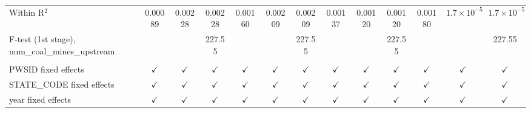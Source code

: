 \begin{table}[htbp]
\begin{adjustbox}{width = \textwidth, center}
\begin{tabular}{lcccccccccccc}
         Within R$^2$                                      & 0.00089       & 0.00228        & 0.00228       & 0.00160       & 0.00209        & 0.00209       & 0.00137       & 0.00120       & 0.00120       & 0.00180       & $1.7\times 10^{-5}$  & $1.7\times 10^{-5}$\\   
         F-test (1st stage), num\_coal\_mines\_upstream    &               &                & 227.55        &               &                & 227.55        &               &               & 227.55        &               &                      & 227.55\\  
          \\
         PWSID fixed effects                               & $\checkmark$  & $\checkmark$   & $\checkmark$  & $\checkmark$  & $\checkmark$   & $\checkmark$  & $\checkmark$  & $\checkmark$  & $\checkmark$  & $\checkmark$  & $\checkmark$         & $\checkmark$\\   
         STATE\_CODE fixed effects                         & $\checkmark$  & $\checkmark$   & $\checkmark$  & $\checkmark$  & $\checkmark$   & $\checkmark$  & $\checkmark$  & $\checkmark$  & $\checkmark$  & $\checkmark$  & $\checkmark$         & $\checkmark$\\   
         year fixed effects                                & $\checkmark$  & $\checkmark$   & $\checkmark$  & $\checkmark$  & $\checkmark$   & $\checkmark$  & $\checkmark$  & $\checkmark$  & $\checkmark$  & $\checkmark$  & $\checkmark$         & $\checkmark$\\   
         \bottomrule
      \end{tabular}
   \end{adjustbox}
\end{table}


